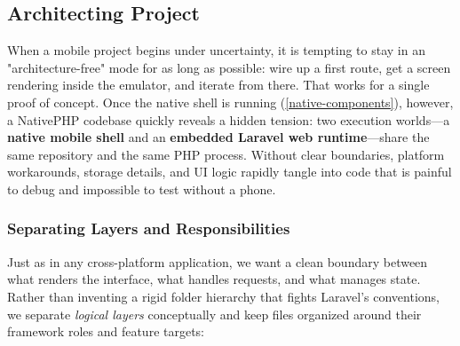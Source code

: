 
\subsection{Architecting Project} \label{architecture}

When a mobile project begins under uncertainty, it is tempting to stay in an "architecture-free"
mode for as long as possible: wire up a first route, get a screen rendering inside the emulator,
and iterate from there. That works for a single proof of concept. Once the native shell is
running (\cref{native-components}), however, a NativePHP codebase quickly reveals a hidden
tension: two execution worlds---a \textbf{native mobile shell} and an \textbf{embedded Laravel
web runtime}---share the same repository and the same PHP process. Without clear boundaries,
platform workarounds, storage details, and UI logic rapidly tangle into code that is painful to
debug and impossible to test without a phone.


\subsubsection{Separating Layers and Responsibilities}

Just as in any cross-platform application, we want a clean boundary between what renders the
interface, what handles requests, and what manages state. Rather than inventing a rigid folder
hierarchy that fights Laravel's conventions, we separate \emph{logical layers} conceptually and
keep files organized around their framework roles and feature targets:

\hspace{0.5cm}
\hspace{1cm}

